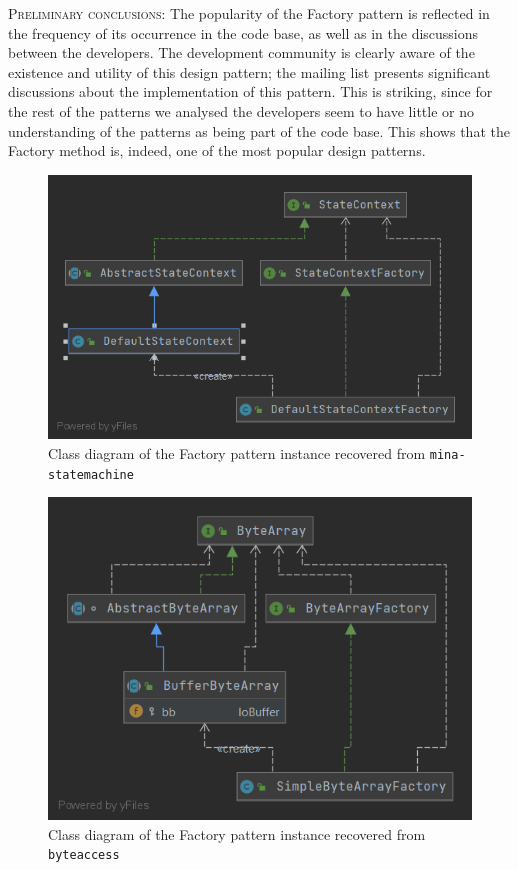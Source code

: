 \textsc{Preliminary conclusions}: The popularity of the Factory pattern is reflected in the frequency of its occurrence in the code base, as well as in the discussions between the developers. The development community is clearly aware of the existence and utility of this design pattern; the mailing list presents significant discussions about the implementation of this pattern. This is striking, since for the rest of the patterns we analysed the developers seem to have little or no understanding of the patterns as being part of the code base. This shows that the Factory method is, indeed, one of the most popular design patterns.

\begin{figure}[H]
    \centering
    \includegraphics[width = 0.7 \textwidth]{images/class_diagrams/factory1.png}
    \caption{Class diagram of the Factory pattern instance recovered from \texttt{mina-statemachine}}
    \label{fig:factory1}
\end{figure}

\begin{figure}[H]
    \centering
    \includegraphics[width = 0.6 \textwidth]{images/class_diagrams/factory2.png}
    \caption{Class diagram of the Factory pattern instance recovered from \texttt{byteaccess}}
    \label{fig:factory2}
\end{figure}

